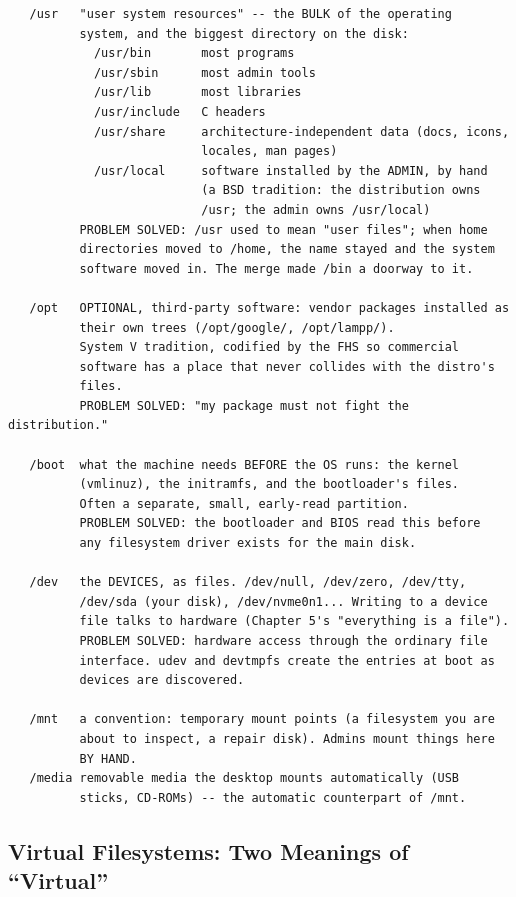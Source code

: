 \begin{verbatim}
   /usr   "user system resources" -- the BULK of the operating
          system, and the biggest directory on the disk:
            /usr/bin       most programs
            /usr/sbin      most admin tools
            /usr/lib       most libraries
            /usr/include   C headers
            /usr/share     architecture-independent data (docs, icons,
                           locales, man pages)
            /usr/local     software installed by the ADMIN, by hand
                           (a BSD tradition: the distribution owns
                           /usr; the admin owns /usr/local)
          PROBLEM SOLVED: /usr used to mean "user files"; when home
          directories moved to /home, the name stayed and the system
          software moved in. The merge made /bin a doorway to it.

   /opt   OPTIONAL, third-party software: vendor packages installed as
          their own trees (/opt/google/, /opt/lampp/).
          System V tradition, codified by the FHS so commercial
          software has a place that never collides with the distro's
          files.
          PROBLEM SOLVED: "my package must not fight the distribution."

   /boot  what the machine needs BEFORE the OS runs: the kernel
          (vmlinuz), the initramfs, and the bootloader's files.
          Often a separate, small, early-read partition.
          PROBLEM SOLVED: the bootloader and BIOS read this before
          any filesystem driver exists for the main disk.

   /dev   the DEVICES, as files. /dev/null, /dev/zero, /dev/tty,
          /dev/sda (your disk), /dev/nvme0n1... Writing to a device
          file talks to hardware (Chapter 5's "everything is a file").
          PROBLEM SOLVED: hardware access through the ordinary file
          interface. udev and devtmpfs create the entries at boot as
          devices are discovered.

   /mnt   a convention: temporary mount points (a filesystem you are
          about to inspect, a repair disk). Admins mount things here
          BY HAND.
   /media removable media the desktop mounts automatically (USB
          sticks, CD-ROMs) -- the automatic counterpart of /mnt.
\end{verbatim}

\subsection{Virtual Filesystems: Two Meanings of ``Virtual''}

